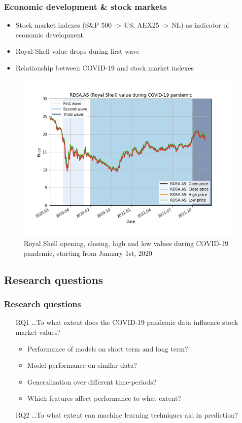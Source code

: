 \documentclass[aspectratio=169,classic]{uva-inf-presentation}
\begin{document}
\begin{frame}
\frametitle{Economic development \& stock markets}
\begin{itemize}
    \item Stock market indexes (S\&P 500 -> US; AEX25 -> NL) as indicator of economic development
    \item Royal Shell value drops during first wave
    \item Relationship between COVID-19 and stock market indexes
\end{itemize}
\begin{figure}\centering
    \includegraphics[trim=0cm 1.5cm 0 -3cm, scale=0.4]{images/covid_19_RDSA.png}
    \caption{Royal Shell opening, closing, high and low values during COVID-19 pandemic, starting from January 1st, 2020}
\end{figure}
\end{frame}

\onecolumn



\subsection{Research questions}
\begin{frame}
\frametitle{Research questions}
\begin{itemize}
    \item[RQ1] \ldots To what extent does the COVID-19 pandemic data influence stock market values?
        \begin{itemize}
            \item Performance of models on short term and long term?
            \item Model performance on similar data?
            \item Generalization over different time-periods?
            \item Which features affect performance to what extent?
        \end{itemize}
    \item[RQ2] \ldots To what extent can machine learning techniques aid in prediction?
\end{itemize}
\end{frame}
\end{document}
